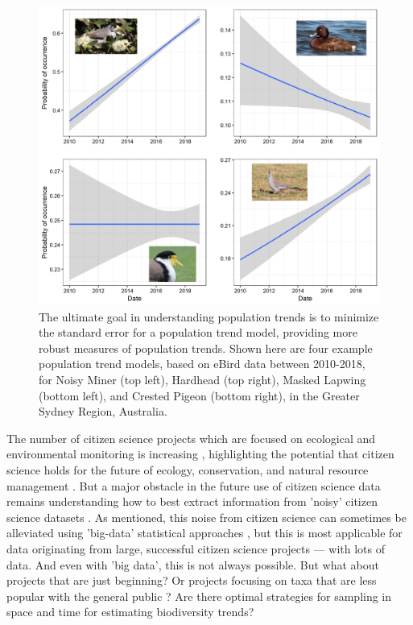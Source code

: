 \documentclass[9pt,twocolumn,twoside,lineno]{pnas-new}
\begin{document}
\begin{figure}[!hb]
\centering
\includegraphics[width=.8\linewidth]{glm_examples_edited.png}
\caption{The ultimate goal in understanding population trends is to minimize the standard error for a population trend model, providing more robust measures of population trends. Shown here are four example population trend models, based on eBird data between 2010-2018, for Noisy Miner (top left), Hardhead (top right), Masked Lapwing (bottom left), and Crested Pigeon (bottom right), in the Greater Sydney Region, Australia.}
\label{fig1}
\end{figure}

The number of citizen science projects which are focused on ecological and environmental monitoring is increasing \cite{pocock2017diversity, theobald2015global}, highlighting the potential that citizen science holds for the future of ecology, conservation, and natural resource management \cite{pocock2018vision, silvertown2009new, soroye2018opportunistic, mckinley2017citizen}. But a major obstacle in the future use of citizen science data remains understanding how to best extract information from 'noisy' citizen science datasets \cite{parrish2018exposing}. As mentioned, this noise from citizen science \cite{bird2014statistical} can sometimes be alleviated using 'big-data' statistical approaches \cite{kelling2015taking}, but this is most applicable for data originating from large, successful citizen science projects --- with lots of data. And even with 'big data', this is not always possible. But what about projects that are just beginning? Or projects focusing on taxa that are less popular with the general public \cite{mair2016explaining, ward2014understanding}? Are there optimal strategies for sampling in space and time for estimating biodiversity trends?
\end{document}
